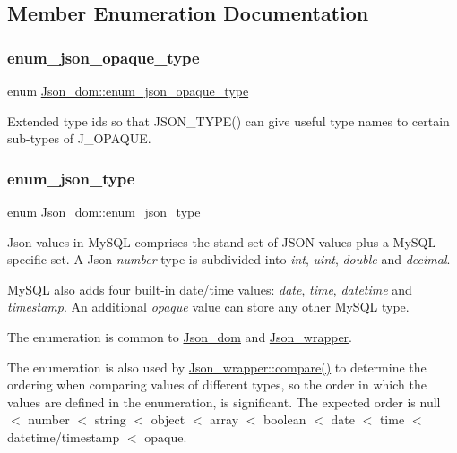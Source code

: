 \subsection{Member Enumeration Documentation}
\mbox{\label{classJson__dom_afb217ce26a75cf2a34494e19e2212842}} 
\subsubsection{\texorpdfstring{enum\+\_\+json\+\_\+opaque\+\_\+type}{enum\_json\_opaque\_type}}
{\footnotesize\ttfamily enum \mbox{\hyperlink{classJson__dom_afb217ce26a75cf2a34494e19e2212842}{Json\+\_\+dom\+::enum\+\_\+json\+\_\+opaque\+\_\+type}}}

Extended type ids so that J\+S\+O\+N\+\_\+\+T\+Y\+P\+E() can give useful type names to certain sub-\/types of J\+\_\+\+O\+P\+A\+Q\+UE. \mbox{\label{classJson__dom_af37eed7dfe1da1d6507d3ab85320eb03}} 
\subsubsection{\texorpdfstring{enum\+\_\+json\+\_\+type}{enum\_json\_type}}
{\footnotesize\ttfamily enum \mbox{\hyperlink{classJson__dom_af37eed7dfe1da1d6507d3ab85320eb03}{Json\+\_\+dom\+::enum\+\_\+json\+\_\+type}}}

Json values in My\+S\+QL comprises the stand set of J\+S\+ON values plus a My\+S\+QL specific set. A Json {\itshape number} type is subdivided into {\itshape int}, {\itshape uint}, {\itshape double} and {\itshape decimal}.

My\+S\+QL also adds four built-\/in date/time values\+: {\itshape date}, {\itshape time}, {\itshape datetime} and {\itshape timestamp}. An additional {\itshape opaque} value can store any other My\+S\+QL type.

The enumeration is common to \mbox{\hyperlink{classJson__dom}{Json\+\_\+dom}} and \mbox{\hyperlink{classJson__wrapper}{Json\+\_\+wrapper}}.

The enumeration is also used by \mbox{\hyperlink{classJson__wrapper_aba6801a36265c71f07e888c5042f63df}{Json\+\_\+wrapper\+::compare()}} to determine the ordering when comparing values of different types, so the order in which the values are defined in the enumeration, is significant. The expected order is null $<$ number $<$ string $<$ object $<$ array $<$ boolean $<$ date $<$ time $<$ datetime/timestamp $<$ opaque. 

